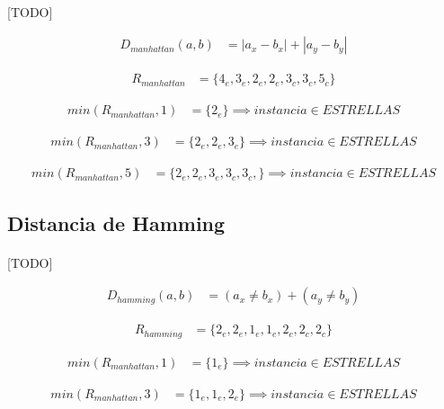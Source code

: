 \documentclass{article}
\begin{document}
			\paragraph{}
			[TODO]

			\begin{align}
				D_{manhattan}(a,b) &= |a_x - b_x| + |a_y - b_y|
			\end{align}

			\begin{align}
				R_{manhattan} &= \{4_e, 3_e, 2_e, 2_e, 3_c, 3_c, 5_c\}
			\end{align}

			\begin{align}
				min(R_{manhattan},1) &= \{ 2_e \}  \implies instancia \in ESTRELLAS
			\end{align}

			\begin{align}
				min(R_{manhattan},3) &= \{ 2_e, 2_e, 3_e\}  \implies instancia \in ESTRELLAS
			\end{align}

			\begin{align}
				min(R_{manhattan},5) &= \{ 2_e, 2_e, 3_e, 3_c, 3_c, \} \implies instancia \in ESTRELLAS
			\end{align}

		\subsection{Distancia de Hamming}

			\paragraph{}
			[TODO]

			\begin{align}
				D_{hamming}(a,b) &= (a_x \neq b_x) + (a_y \neq b_y)
			\end{align}

			\begin{align}
				R_{hamming} &= \{2_e, 2_e, 1_e, 1_e, 2_c, 2_c, 2_c\}
			\end{align}

			\begin{align}
				min(R_{manhattan},1) &= \{ 1_e \}  \implies instancia \in ESTRELLAS
			\end{align}

			\begin{align}
				min(R_{manhattan},3) &= \{ 1_e, 1_e, 2_e\}  \implies instancia \in ESTRELLAS
			\end{align}
\end{document}
